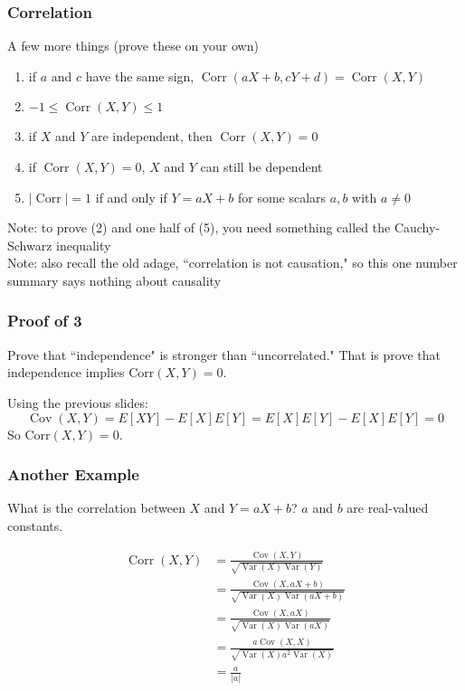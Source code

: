 \documentclass{beamer}
\begin{document}
\begin{frame}
\frametitle{Correlation}

A few more things (prove these on your own)
\begin{enumerate}
\item if $a$ and $c$ have the same sign, $\operatorname{Corr}(aX + b, cY + d) = \operatorname{Corr}(X,Y)$
\item $-1 \le \operatorname{Corr}(X,Y) \le 1$
\item if $X$ and $Y$ are independent, then $\operatorname{Corr}(X,Y) = 0$
\item if $\operatorname{Corr}(X,Y) = 0$, $X$ and $Y$ can still be dependent
\item $|\operatorname{Corr}| = 1$ if and only if $Y = aX + b$ for some scalars $a,b$ with $a \neq 0$
\end{enumerate}

Note: to prove (2) and one half of (5), you need something called the Cauchy-Schwarz inequality \\

Note: also recall the old adage, ``correlation is not causation," so this one number summary says nothing about causality
\end{frame}


\begin{frame}
\frametitle{Proof of 3}

Prove that ``independence" is stronger than ``uncorrelated." That is prove that independence implies $\text{Corr}(X,Y) = 0$.
\pause

Using the previous slides:
\[
\operatorname{Cov}(X,Y) = E[XY] -E[X]E[Y] = E[X]E[Y] - E[X]E[Y] = 0
\]
So $\text{Corr}(X,Y) = 0$.

\end{frame}


\begin{frame}
\frametitle{Another Example}

What is the correlation between $X$ and $Y = aX + b$? $a$ and $b$ are real-valued constants.
\pause

\begin{align*}
\operatorname{Corr}(X,Y) &= \frac{\operatorname{Cov}(X,Y)}{\sqrt{\operatorname{Var}(X) \operatorname{Var}(Y) }} \\
&= \frac{\operatorname{Cov}(X,aX+b)}{\sqrt{\operatorname{Var}(X) \operatorname{Var}(aX+b) }} \\
&= \frac{\operatorname{Cov}(X,aX)}{\sqrt{\operatorname{Var}(X) \operatorname{Var}(aX) }} \\
&= \frac{a \operatorname{Cov}(X,X)}{\sqrt{\operatorname{Var}(X) a^2 \operatorname{Var}(X) }} \\
&= \frac{a}{|a|} 
\end{align*}



\end{frame}
\end{document}
